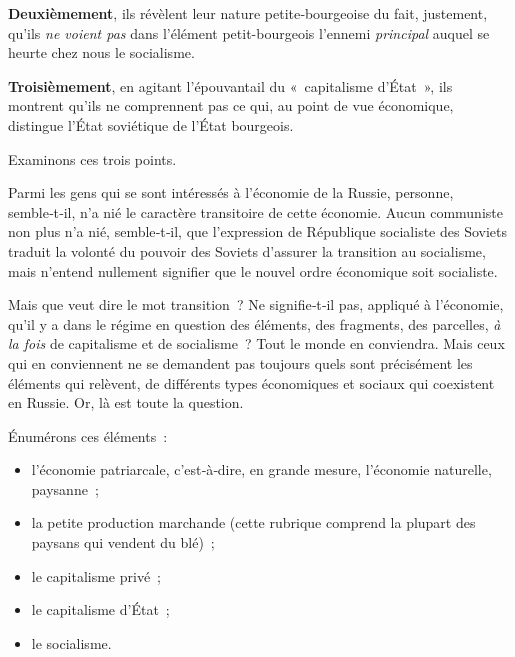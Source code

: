 \documentclass[french,twoside]{book} %
\begin{document}
\textbf{Deuxièmement}, ils révèlent leur nature petite‑bourgeoise du fait, justement, qu’ils \emph{ne voient pas} dans l’élément petit-bourgeois l’ennemi \emph{principal} auquel se heurte chez nous le socialisme.\par
\textbf{Troisièmement}, en agitant l’épouvantail du « capitalisme d’État », ils montrent qu’ils ne comprennent pas ce qui, au point de vue économique, distingue l’État soviétique de l’État bourgeois.\par
Examinons ces trois points.\par
Parmi les gens qui se sont intéressés à l’économie de la Russie, personne, semble‑t‑il, n’a nié le caractère transitoire de cette économie. Aucun communiste non plus n’a nié, semble‑t‑il, que l’expression de République socialiste des Soviets traduit la volonté du pouvoir des Soviets d’assurer la transition au socialisme, mais n’entend nullement signifier que le nouvel ordre économique soit socialiste.\par
Mais que veut dire le mot transition ? Ne signifie‑t‑il pas, appliqué à l’économie, qu’il y a dans le régime en question des éléments, des fragments, des parcelles, \emph{à la fois} de capitalisme et de socialisme ? Tout le monde en conviendra. Mais ceux qui en conviennent ne se demandent pas toujours quels sont précisément les éléments qui relèvent, de différents types économiques et sociaux qui coexistent en Russie. Or, là est toute la question.\par
Énumérons ces éléments :\par

\begin{itemize}[itemsep=0pt,]
\item l’économie patriarcale, c’est‑à‑dire, en grande mesure, l’économie naturelle, paysanne ;
\item la petite production marchande (cette rubrique comprend la plupart des paysans qui vendent du blé) ;
\item le capitalisme privé ;
\item le capitalisme d’État ;
\item le socialisme.
\end{itemize}
\end{document}
